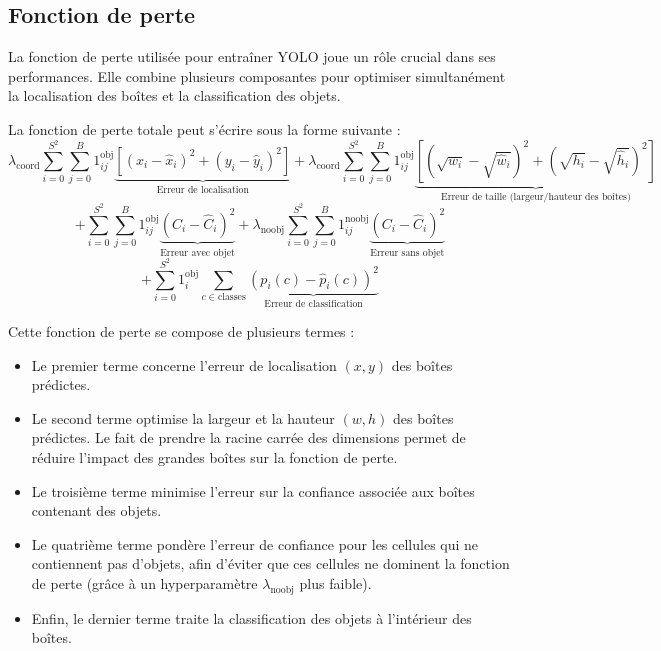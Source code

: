 \documentclass[a4paper,11pt]{article}
\begin{document}
\subsection{Fonction de perte}

\indent La fonction de perte utilisée pour entraîner YOLO joue un rôle crucial dans ses performances. Elle combine plusieurs composantes pour optimiser simultanément la localisation des boîtes et la classification des objets.

La fonction de perte totale peut s'écrire sous la forme suivante :
\[
\lambda_{\text{coord}} \sum_{i=0}^{S^2} \sum_{j=0}^{B} 1^{\text{obj}}_{ij} \underbrace{\left[(x_i - \hat{x}_i)^2 + (y_i - \hat{y}_i)^2\right]}_{\text{Erreur de localisation}}
+ \lambda_{\text{coord}} \sum_{i=0}^{S^2} \sum_{j=0}^{B} 1^{\text{obj}}_{ij} \underbrace{\left[\left(\sqrt{w_i} - \sqrt{\hat{w}_i}\right)^2 + \left(\sqrt{h_i} - \sqrt{\hat{h}_i}\right)^2 \right]}_{\text{Erreur de taille (largeur/hauteur des boîtes)}}
\]
\[
+ \sum_{i=0}^{S^2} \sum_{j=0}^{B} 1^{\text{obj}}_{ij} \underbrace{\left(C_i - \hat{C}_i\right)^2}_{\text{Erreur avec objet}} 
+ \lambda_{\text{noobj}} \sum_{i=0}^{S^2} \sum_{j=0}^{B} 1^{\text{noobj}}_{ij} \underbrace{\left(C_i - \hat{C}_i\right)^2}_{\text{Erreur sans objet}}
\]
\[
+ \sum_{i=0}^{S^2} 1^{\text{obj}}_i \sum_{c \in \text{classes}} \underbrace{\left(p_i(c) - \hat{p}_i(c)\right)^2}_{\text{Erreur de classification}}
\]

\noindent Cette fonction de perte se compose de plusieurs termes :
\begin{itemize}
    \item Le premier terme concerne l'erreur de localisation $(x, y)$ des boîtes prédictes.
    \item Le second terme optimise la largeur et la hauteur $(w, h)$ des boîtes prédictes. Le fait de prendre la racine carrée des dimensions permet de réduire l'impact des grandes boîtes sur la fonction de perte.
    \item Le troisième terme minimise l'erreur sur la confiance associée aux boîtes contenant des objets.
    \item Le quatrième terme pondère l'erreur de confiance pour les cellules qui ne contiennent pas d’objets, afin d’éviter que ces cellules ne dominent la fonction de perte (grâce à un hyperparamètre $\lambda_{\text{noobj}}$ plus faible).
    \item Enfin, le dernier terme traite la classification des objets à l'intérieur des boîtes.
\end{itemize}
\end{document}
